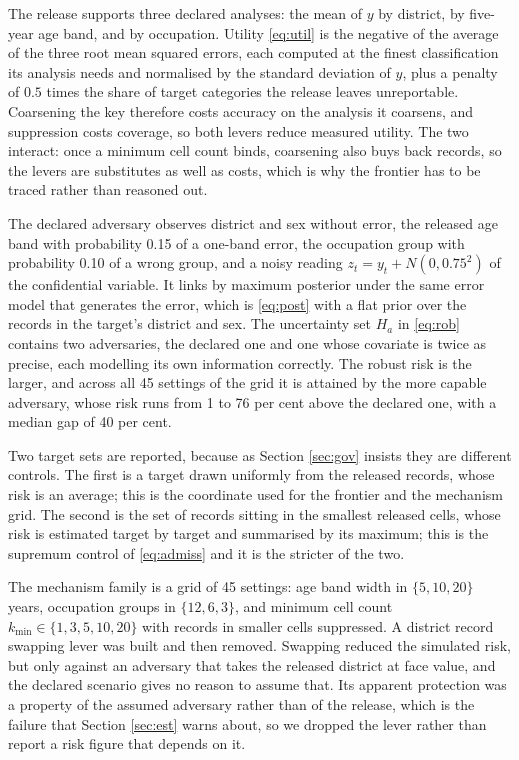 \documentclass[11pt,a4paper]{article}
\theoremstyle{plain}
\theoremstyle{definition}
\theoremstyle{definition}
\theoremstyle{plain}
\begin{document}
The release supports three declared analyses: the mean of $y$ by district, by
five-year age band, and by occupation. Utility \eqref{eq:util} is the negative
of the average of the three root mean squared errors, each computed at the
finest classification its analysis needs and normalised by the standard
deviation of $y$, plus a penalty of $0.5$ times the share of target categories
the release leaves unreportable. Coarsening the key therefore costs accuracy on the analysis it coarsens, and
suppression costs coverage, so both levers reduce measured utility. The two interact: once
a minimum cell count binds, coarsening also buys back records, so the levers are
substitutes as well as costs, which is why the frontier has to be traced rather
than reasoned out.

The declared adversary observes district and sex without error, the released
age band with probability 0.15 of a one-band error, the occupation group with
probability 0.10 of a wrong group, and a noisy reading $z_t = y_t + N(0,
0.75^2)$ of the confidential variable. It links by maximum posterior under the
same error model that generates the error, which is \eqref{eq:post} with a flat
prior over the records in the target's district and sex. The uncertainty set
$H_a$ in \eqref{eq:rob} contains two adversaries, the declared one and one
whose covariate is twice as precise, each modelling its own information
correctly. The robust risk is the larger, and across all 45 settings of the
grid it is attained by the more capable adversary, whose risk runs from 1 to 76
per cent above the declared one, with a median gap of 40 per cent.

Two target sets are reported, because as Section \ref{sec:gov} insists they are
different controls. The first is a target drawn uniformly from the released
records, whose risk is an average; this is the coordinate used for the frontier
and the mechanism grid. The second is the set of records sitting in the smallest
released cells, whose risk is estimated target by target and summarised by its
maximum; this is the supremum control of \eqref{eq:admiss} and it is the
stricter of the two.

The mechanism family is a grid of 45 settings: age band width in
$\{5, 10, 20\}$ years, occupation groups in $\{12, 6, 3\}$, and minimum cell
count $k_{\min} \in \{1, 3, 5, 10, 20\}$ with records in smaller cells
suppressed. A district record swapping lever
\citep{dalenius1982,fienbergmcintyre2004} was built and
then removed. Swapping reduced the simulated risk, but only against an
adversary that takes the released district at face value, and the declared
scenario gives no reason to assume that. Its apparent protection was a property
of the assumed adversary rather than of the release, which is the failure that
Section \ref{sec:est} warns about, so we dropped the lever rather than report a
risk figure that depends on it.
\end{document}
